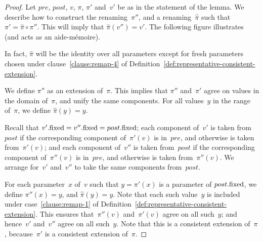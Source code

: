 \begin{proof}
Let $pre$, $post$, $v$, $\pi$, $\pi'$ and~$v'$ be as in the statement of the
lemma.  We describe how to construct the renaming~$\pi''$, and a
renaming~$\hat\pi$ such that $\pi' = \hat\pi \circ \pi''$.  This will imply
that $\hat\pi(v'') = v'$.  The following figure illustrates (and acts as an
aide-m\'emoire).
%
\begin{center}
\end{center}
%
In fact, $\hat\pi$ will be the identity over all parameters except for fresh
parameters chosen under clause~\ref{clause:remap-4} of
Definition~\ref{def:representative-consistent-extension}.

We define $\pi''$ as an extension of~$\pi$.  This implies that $\pi''$
and~$\pi'$ agree on values in the domain of~$\pi$, and unify the same
components.  For all values~$y$ in the range of~$\pi$, we define $\hat\pi(y) =
y$. 

Recall that $v'.\mathrm{fixed} = v''.\mathrm{fixed} = post.\mathrm{fixed}$; each component of~$v'$ is
taken from~$post$ if the corresponding component of~$\pi'(v)$ is in~$pre$, and
otherwise is taken from~$\pi'(v)$; and each component of~$v''$ is taken
from~$post$ if the corresponding component of~$\pi''(v)$ is in~$pre$, and
otherwise is taken from~$\pi''(v)$.  We arrange for~$v'$ and~$v''$ to take the
same components from~$post$.


For each parameter~$x$ of~$v$ such that $y = \pi'(x)$ is a parameter of
$post.\mathrm{fixed}$, we define $\pi''(x) = y$, and $\hat\pi(y) = y$.  Note that each
such value~$y$ is included under case~\ref{clause:remap-1} of
Definition~\ref{def:representative-consistent-extension}.  This ensures
that~$\pi''(v)$ and~$\pi'(v)$ agree on all such~$y$; and hence~$v'$ and~$v''$
agree on all such~$y$.  Note that this is a consistent extension of~$\pi$,
because~$\pi'$ is a consistent extension of~$\pi$.  


\end{proof}

